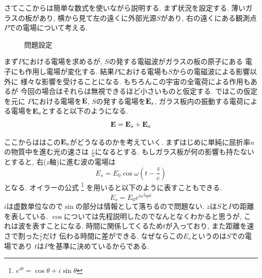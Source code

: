\documentclass[a4paper, xelatex, ja=standard]{bxjsarticle}
\begin{document}
さてここからは簡単な数式を使いながら説明する.
まず状況を設定する.
薄いガラスの板があり,
横から見て左の遠くに外部光源$S$があり,
右の遠くにある観測点$P$での電場について考える.
\begin{figure}[h]
\centering
\caption{問題設定}
\label{fig:light-refraction}
\end{figure}
まず$P$における電場を求めるが,
$S$の発する電磁波がガラスの板の原子にある
電子にも作用し電場が変化する.
結果$P$における電場も$S$からの電磁波による影響以外に
様々な影響を受けることになる.
もちろんこの宇宙の全電荷による作用もあるが
今回の場合はそれらは無視できるほど小さいものと仮定する.
ではこの仮定を元に
$P$における電場を$\vb{E}$,
$S$の発する電場を$\vb{E}_s$,
ガラス板内の振動する電荷による電場を$\vb{E}_a$とすると以下のようになる.
\begin{equation}
\vb{E}=\vb{E}_s+\vb{E}_a
\end{equation}

ここからははこの$\vb{E}_a$がどうなるのかを考えていく.
まずはじめに単純に屈折率$n$の物質中を進む光の速さは
$\frac{c}{n}$になるとする.
もしガラス板が何の影響も持たないとすると,
右($z$軸)に進む波の電場は
\begin{equation*}
E_s=E_0\cos{\omega\left(t-\frac{z}{c}\right)}
\end{equation*}
となる.
オイラーの公式
\footnote{$e^{i\theta}=\cos{\theta}+i\sin{\theta}$}
を用いると以下のように表すこともできる.
\begin{equation*}
E_s=E_0e^{i\omega\frac{t-z}{c}}
\end{equation*}
$i$は虚数単位なので$\sin$の部分は情報として落ちるので問題ない.
$z$は$S$と$P$の距離を表している.
$\cos$については先程説明したのでなんとなくわかると思うが,
これは波を表すことになる.
時間に関係してくるため$t$が入っており,
また距離を速さで割った$\frac{z}{c}$だけ
伝わる時間に差ができる.
なぜならこの$E_s$というのは$S$での電場であり
$t$は$P$を基準に決めているからである.
\end{document}
